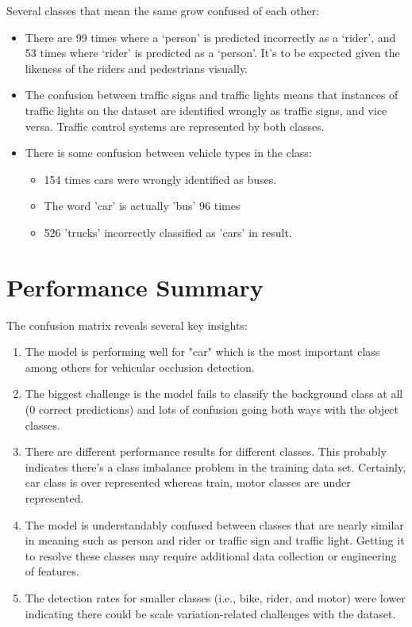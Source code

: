 \documentclass[12pt,a4paper]{report}
\theoremstyle{definition}
\theoremstyle{remark}
\begin{document}
Several classes that mean the same grow confused of each other:

\begin{itemize}
\item There are 99 times where a ‘person’ is predicted incorrectly as a ‘rider’, and 53 times where ‘rider’ is predicted as a ‘person’. It’s to be expected given the likeness of the riders and pedestrians visually.
	
	\item The confusion between traffic signs and traffic lights means that instances of traffic lights on the dataset are identified wrongly as traffic signs, and vice versa. Traffic control systems are represented by both classes.

	\item There is some confusion between vehicle types in the class:
	\begin{itemize}
		\item 154 times cars were wrongly identified as buses.
		\item The word 'car' is actually 'bus' 96 times
		\item 526 'trucks' incorrectly classified as 'cars' in result.
	\end{itemize}
\end{itemize}

\section*{Performance Summary}

The confusion matrix reveals several key insights:

\begin{enumerate}
	\item The model is performing well for "car" which is the most important class among others for vehicular occlusion detection.

	
	\item The biggest challenge is the model fails to classify the background class at all (0 correct predictions) and lots of confusion going both ways with the object classes.

	
	\item There are different performance results for different classes. This probably indicates there's a class imbalance problem in the training data set. Certainly, car class is over represented whereas train, motor classes are under represented.

	
	\item The model is understandably confused between classes that are nearly similar in meaning such as person and rider or traffic sign and traffic light. Getting it to resolve these classes may require additional data collection or engineering of features.

	
	\item The detection rates for smaller classes (i.e., bike, rider, and motor) were lower indicating there could be scale variation-related challenges with the dataset.

\end{enumerate}
\end{document}

